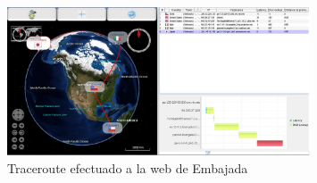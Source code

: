 \documentclass[letterpaper,10pt,onecolumn,titlepage]{article}
\begin{document}
\begin{figure}
  \centering
    \includegraphics[width=0.8\textwidth]{./4.jpg}
  \caption{Traceroute efectuado a la web de Embajada}
  \label{fig:Traceroute efectuado a la web de Embajada}
\end{figure}
\end{document}
